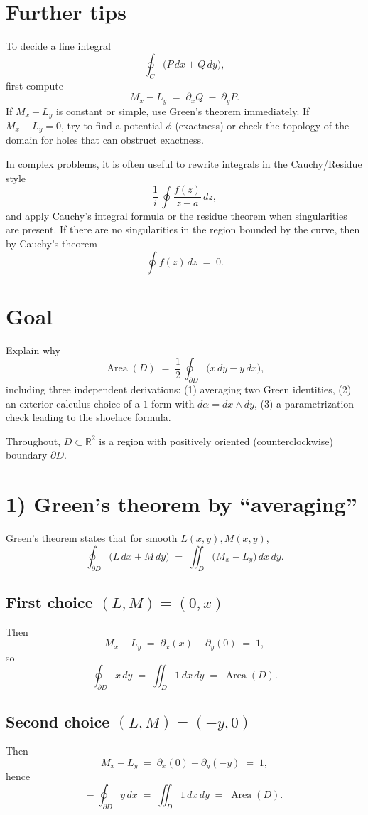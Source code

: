 \documentclass[11pt]{article}
\begin{document}
\section*{Further tips}

To decide a line integral
\[
\oint_{C} \bigl(P\,dx + Q\,dy\bigr),
\]
first compute
\[
M_{x} - L_{y} \;=\; \partial_{x}Q \;-\; \partial_{y}P.
\]
If $M_{x} - L_{y}$ is constant or simple, use Green's theorem immediately. If $M_{x} - L_{y}=0$, try to find a potential $\phi$ (exactness) or check the topology of the domain for holes that can obstruct exactness.

In complex problems, it is often useful to rewrite integrals in the Cauchy/Residue style
\[
\frac{1}{i}\,\oint \frac{f(z)}{z-a}\,dz,
\]
and apply Cauchy’s integral formula or the residue theorem when singularities are present. If there are no singularities in the region bounded by the curve, then by Cauchy’s theorem
\[
\oint f(z)\,dz \;=\; 0.
\]


\section*{Goal}
Explain why
\[
\operatorname{Area}(D)
\;=\;
\frac{1}{2}\,\oint_{\partial D}\!\bigl(x\,dy - y\,dx\bigr),
\]
including three independent derivations:
(1) averaging two Green identities,
(2) an exterior-calculus choice of a $1$-form with \(d\alpha = dx\wedge dy\),
(3) a parametrization check leading to the shoelace formula.

Throughout, \(D\subset\mathbb R^2\) is a region with positively oriented (counterclockwise) boundary \(\partial D\).

\section*{1) Green’s theorem by ``averaging''}

Green’s theorem states that for smooth \(L(x,y),M(x,y)\),
\[
\oint_{\partial D}\!\bigl(L\,dx + M\,dy\bigr)
\;=\;
\iint_{D}\!\bigl(M_x - L_y\bigr)\,dx\,dy.
\]

\subsection*{First choice \((L,M)=(0,x)\)}
Then
\[
M_x - L_y \;=\; \partial_x(x) - \partial_y(0) \;=\; 1,
\]
so
\[
\oint_{\partial D} x\,dy
\;=\;
\iint_D 1\,dx\,dy
\;=\;
\operatorname{Area}(D).
\]

\subsection*{Second choice \((L,M)=(-y,0)\)}
Then
\[
M_x - L_y \;=\; \partial_x(0) - \partial_y(-y) \;=\; 1,
\]
hence
\[
-\;\oint_{\partial D} y\,dx
\;=\;
\iint_D 1\,dx\,dy
\;=\;
\operatorname{Area}(D).
\]
\end{document}
